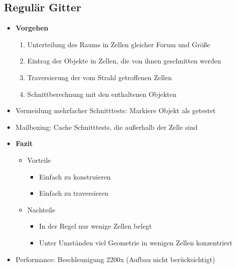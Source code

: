 \subsection{Regulär Gitter}
\begin{itemize}
	\item \textbf{Vorgehen}
	\begin{enumerate}
		\item Unterteilung des Raums in Zellen gleicher Forum und Größe
		\item Eintrag der Objekte in Zellen, die von ihnen geschnitten werden
		\item Traversierung der vom Strahl getroffenen Zellen
		\item Schnittberechnung mit den enthaltenen Objekten
	\end{enumerate}
	\item Vermeidung mehrfacher Schnitttests: Markiere Objekt als getestet
	\item Mailboxing: Cache Schnitttests, die außerhalb der Zelle sind
	\item \textbf{Fazit}
	\begin{itemize}
		\item Vorteile
		\begin{itemize}
			\item Einfach zu konstruieren
			\item Einfach zu traversieren
		\end{itemize}
		\item Nachteile
		\begin{itemize}
			\item In der Regel nur wenige Zellen belegt
			\item Unter Umständen viel Geometrie in wenigen Zellen konzentriert
		\end{itemize}
	\end{itemize}
	\item Performance: Beschleunigung 2200x (Aufbau nicht berücksichtigt)
\end{itemize}


